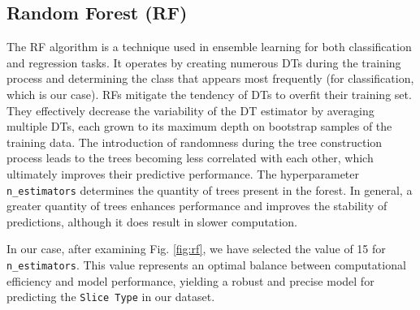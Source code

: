 \documentclass[conference]{IEEEtran}
\begin{document}
\subsection{Random Forest (RF)}
The RF algorithm is a technique used in ensemble learning for both classification and regression tasks. It operates by creating numerous DTs during the training process and determining the class that appears most frequently (for classification, which is our case). RFs mitigate the tendency of DTs to overfit their training set. They effectively decrease the variability of the DT estimator by averaging multiple DTs, each grown to its maximum depth on bootstrap samples of the training data. The introduction of randomness during the tree construction process leads to the trees becoming less correlated with each other, which ultimately improves their predictive performance. The hyperparameter \texttt{\footnotesize n\_estimators} determines the quantity of trees present in the forest. In general, a greater quantity of trees enhances performance and improves the stability of predictions, although it does result in slower computation.

In our case, after examining Fig. \ref{fig:rf}, we have selected the value of 15 for \texttt{\footnotesize n\_estimators}. This value represents an optimal balance between computational efficiency and model performance, yielding a robust and precise model for predicting the \texttt{\footnotesize Slice Type} in our dataset.
\end{document}
